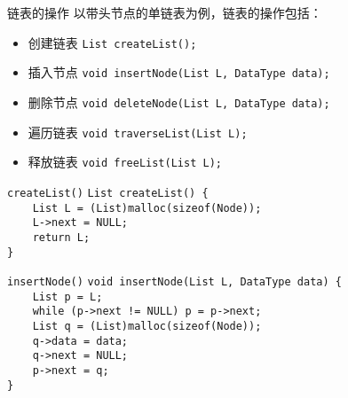\documentclass{beamer}
\begin{document}
\begin{frame}{链表的操作}
    以带头节点的单链表为例，链表的操作包括：
    \begin{itemize}
        \item<1-> 创建链表
        \texttt{List createList();} \\
        \item<2-> 插入节点
        \texttt{void insertNode(List L, DataType data);} \\
        \item<3-> 删除节点
        \texttt{void deleteNode(List L, DataType data);} \\
        \item<4-> 遍历链表
        \texttt{void traverseList(List L);} \\
        \item<5-> 释放链表
        \texttt{void freeList(List L);} \\
    \end{itemize}
\end{frame}

\begin{frame}{\texttt{createList()}}
    \texttt{List createList() \{} \\
    \texttt{\ \ \ \ List L = (List)malloc(sizeof(Node));} \\
    \texttt{\ \ \ \ L->next = NULL;} \\
    \texttt{\ \ \ \ return L;} \\
    \texttt{\}} \\
\end{frame}

\begin{frame}{\texttt{insertNode()}}
    \texttt{void insertNode(List L, DataType data) \{} \\
    \texttt{\ \ \ \ List p = L;} \\
    \texttt{\ \ \ \ while (p->next != NULL) p = p->next;} \\
    \texttt{\ \ \ \ List q = (List)malloc(sizeof(Node));} \\
    \texttt{\ \ \ \ q->data = data;} \\
    \texttt{\ \ \ \ q->next = NULL;} \\
    \texttt{\ \ \ \ p->next = q;} \\
    \texttt{\}} \\
\end{frame}
\end{document}
